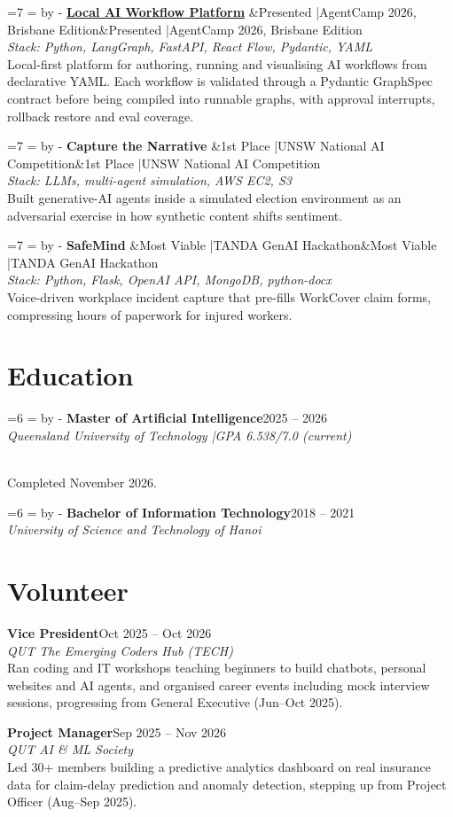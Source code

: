 \documentclass[11pt, a4paper]{article}
\newcommand{\needroom}[1]{%
  \par\begingroup
  \dimen0=#1\relax
  \dimen2=\pagegoal\relax\advance\dimen2 by -\pagetotal\relax
  \ifdim\dimen0>\dimen2\relax\newpage\fi
  \endgroup
}
\newcommand{\role}[4]{%
  \needroom{6\baselineskip}%
  \noindent\textbf{#1}\hfill\textcolor{muted}{#2}\\
  \textit{#3}\hfill\textcolor{muted}{#4}\vspace{3pt}%
}
\newcommand{\project}[3]{%
  \needroom{7\baselineskip}%
  \noindent\textbf{#1}%
  \ifx&#2&\else\hfill\textcolor{muted}{\small #2}\fi\\[-2pt]
  \textcolor{muted}{\small\textit{Stack: #3}}\vspace{3pt}%
}
\newcommand{\volunteer}[4]{%
  \noindent\textbf{#1}\hfill\textcolor{muted}{#2}\\
  \textit{#3}\\[1pt]
  \small #4\vspace{6pt}%
}
\begin{document}
\vspace{6pt}

\project{\href{https://github.com/hieunguyen7337/AI_Agent_Local_Workflow_PLatform}{Local AI Workflow Platform}}{Presented \enspace|\enspace AgentCamp 2026, Brisbane Edition}
{Python, LangGraph, FastAPI, React Flow, Pydantic, YAML}\\
Local-first platform for authoring, running and visualising AI workflows from declarative YAML. Each workflow is validated through a Pydantic GraphSpec contract before being compiled into runnable graphs, with approval interrupts, rollback restore and eval coverage.

\vspace{6pt}

\project{Capture the Narrative}{1st Place \enspace|\enspace UNSW National AI Competition}
{LLMs, multi-agent simulation, AWS EC2, S3}\\
Built generative-AI agents inside a simulated election environment as an adversarial exercise in how synthetic content shifts sentiment.

\vspace{6pt}

\project{SafeMind}{Most Viable \enspace|\enspace TANDA GenAI Hackathon}
{Python, Flask, OpenAI API, MongoDB, python-docx}\\
Voice-driven workplace incident capture that pre-fills WorkCover claim forms, compressing hours of paperwork for injured workers.

\section{Education}

\role{Master of Artificial Intelligence}{2025 -- 2026}
{Queensland University of Technology \enspace|\enspace GPA 6.538/7.0 (current)}
{}
\\Completed November 2026.

\vspace{4pt}

\role{Bachelor of Information Technology}{2018 -- 2021}
{University of Science and Technology of Hanoi}
{}

\section{Volunteer}

\volunteer{Vice President}{Oct 2025 -- Oct 2026}
{QUT The Emerging Coders Hub (TECH)}
{Ran coding and IT workshops teaching beginners to build chatbots, personal websites and AI agents, and organised career events including mock interview sessions, progressing from General Executive (Jun--Oct 2025).}

\volunteer{Project Manager}{Sep 2025 -- Nov 2026}
{QUT AI \& ML Society}
{Led 30+ members building a predictive analytics dashboard on real insurance data for claim-delay prediction and anomaly detection, stepping up from Project Officer (Aug--Sep 2025).}
\end{document}
